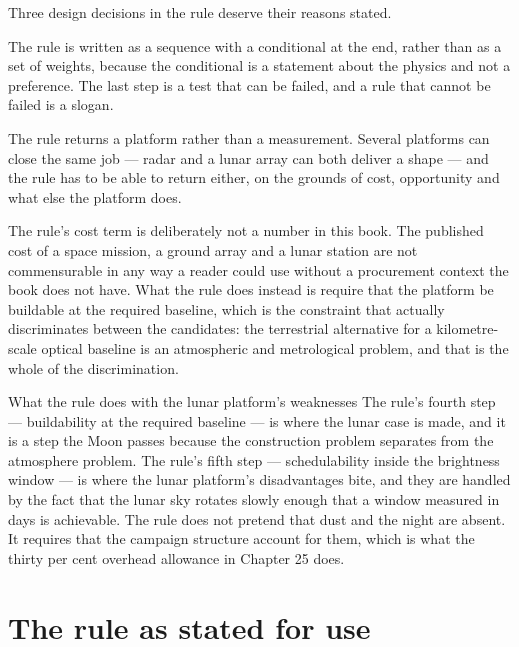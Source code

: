 Three design decisions in the rule deserve their reasons stated.

The rule is written as a sequence with a conditional at the end, rather than
as a set of weights, because the conditional is a statement about the
physics and not a preference. The last step is a test that can be failed,
and a rule that cannot be failed is a slogan.

The rule returns a platform rather than a measurement. Several platforms can
close the same job --- radar and a lunar array can both deliver a shape ---
and the rule has to be able to return either, on the grounds of cost,
opportunity and what else the platform does.

The rule's cost term is deliberately not a number in this book. The
published cost of a space mission, a ground array and a lunar station are
not commensurable in any way a reader could use without a procurement
context the book does not have. What the rule does instead is require that
the platform be buildable at the required baseline, which is the constraint
that actually discriminates between the candidates: the terrestrial
alternative for a kilometre-scale optical baseline is an atmospheric and
metrological problem, and that is the whole of the discrimination.

\begin{deeper}{What the rule does with the lunar platform's weaknesses}
The rule's fourth step --- buildability at the required baseline --- is where
the lunar case is made, and it is a step the Moon passes because the
construction problem separates from the atmosphere problem. The rule's fifth
step --- schedulability inside the brightness window --- is where the lunar
platform's disadvantages bite, and they are handled by the fact that the
lunar sky rotates slowly enough that a window measured in days is
achievable. The rule does not pretend that dust and the night are absent.
It requires that the campaign structure account for them, which is what the
thirty per cent overhead allowance in Chapter 25 does.
\end{deeper}

\section{The rule as stated for use}

